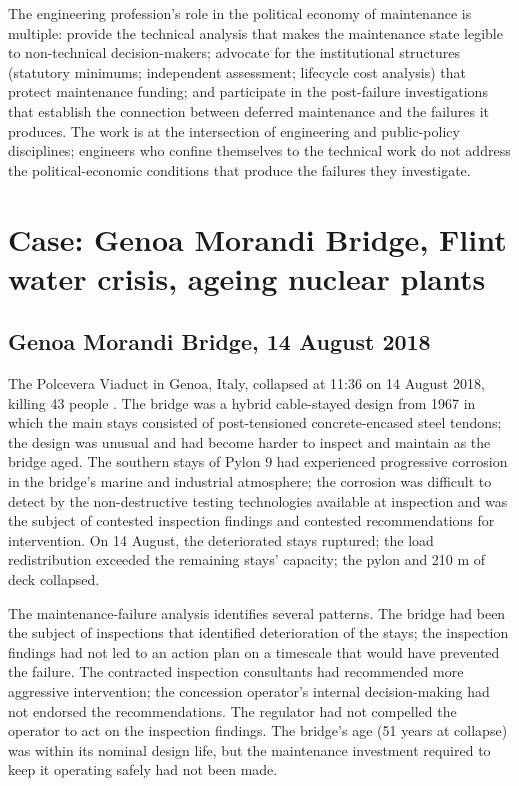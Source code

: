 The engineering profession's role in the political economy of maintenance is multiple: provide the technical analysis that makes the maintenance state legible to non-technical decision-makers; advocate for the institutional structures (statutory minimums; independent assessment; lifecycle cost analysis) that protect maintenance funding; and participate in the post-failure investigations that establish the connection between deferred maintenance and the failures it produces. The work is at the intersection of engineering and public-policy disciplines; engineers who confine themselves to the technical work do not address the political-economic conditions that produce the failures they investigate.

\section{Case: Genoa Morandi Bridge, Flint water crisis, ageing nuclear plants}

\subsection*{Genoa Morandi Bridge, 14 August 2018}

The Polcevera Viaduct in Genoa, Italy, collapsed at 11:36 on 14 August 2018, killing 43 people \cite{acc:mit-morandi-2018}. The bridge was a hybrid cable-stayed design from 1967 in which the main stays consisted of post-tensioned concrete-encased steel tendons; the design was unusual and had become harder to inspect and maintain as the bridge aged. The southern stays of Pylon 9 had experienced progressive corrosion in the bridge's marine and industrial atmosphere; the corrosion was difficult to detect by the non-destructive testing technologies available at inspection and was the subject of contested inspection findings and contested recommendations for intervention. On 14 August, the deteriorated stays ruptured; the load redistribution exceeded the remaining stays' capacity; the pylon and 210 m of deck collapsed.

The maintenance-failure analysis identifies several patterns. The bridge had been the subject of inspections that identified deterioration of the stays; the inspection findings had not led to an action plan on a timescale that would have prevented the failure. The contracted inspection consultants had recommended more aggressive intervention; the concession operator's internal decision-making had not endorsed the recommendations. The regulator had not compelled the operator to act on the inspection findings. The bridge's age (51 years at collapse) was within its nominal design life, but the maintenance investment required to keep it operating safely had not been made.

